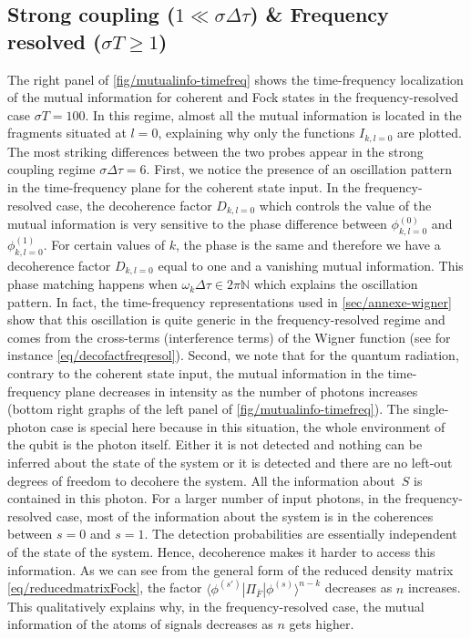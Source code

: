 \subsection{Strong coupling ($1 \ll \sigma\Delta \tau$) \& Frequency
resolved ($\sigma T \geq 1 $)}
\label{sec/fock/freq-resolved}

The right panel of \cref{fig/mutualinfo-timefreq} shows the time-frequency
localization of the mutual information for coherent and Fock states
in the frequency-resolved case $\sigma T = 100 $. In this regime,
almost all the mutual information is located in the fragments situated at
$l=0$, explaining
why only the functions $I_{k,l=0}$ are plotted. The most striking
differences between the two probes appear in the strong coupling regime
$\sigma\Delta\tau =6$.
%
First, we notice the presence of an oscillation pattern in the time-frequency
plane for the coherent state input. In the frequency-resolved case, the decoherence
factor $D_{k,l=0}$ which controls the value of the mutual information is very
sensitive to the phase difference between $\phi_{k,l=0}^{(0)}$ and 
$\phi_{k,l=0}^{(1)}$. For certain values of $k$, the phase is the same and
therefore we have a decoherence factor $D_{k,l=0}$ equal to one and 
a vanishing mutual information. This phase matching happens when 
$\omega_k\Delta\tau \in 2\pi\mathbb{N}$ which explains the oscillation
pattern. In fact, the time-frequency representations used in \cref{sec/annexe-wigner}
show that this oscillation is quite generic in the frequency-resolved regime
and comes from the cross-terms (interference terms) of the Wigner
function (see for instance \cref{eq/decofactfreqresol}).
%
Second, we note that for the quantum radiation, contrary to the coherent state
input, the mutual
information in the time-frequency plane decreases in intensity as the
number of photons increases (bottom right graphs of the left panel
of \cref{fig/mutualinfo-timefreq}). The single-photon case is special
here because in this situation, the whole environment of the
qubit is the photon itself. Either it is not detected and nothing can
be inferred about the state of the system or it is detected and there
are no left-out degrees of freedom to decohere the system. All the
information about~$S$ is contained in this photon.
For a larger number of input photons, in the frequency-resolved case, 
most of the information about the system is in the coherences between 
$s = 0$ and $s = 1$. The detection probabilities
are essentially independent of the state of the system. Hence, decoherence
makes it harder to access this information. As we can see from
the general form of the reduced density matrix \cref{eq/reducedmatrixFock},
the factor $\langle \phi^{(s')} | \Pi_{\bar{F}} | \phi^{(s)} \rangle^{n-k}$
decreases as $n$ increases. This qualitatively explains
why, in the frequency-resolved case, the mutual information of the atoms of
signals decreases as $n$ gets higher.

